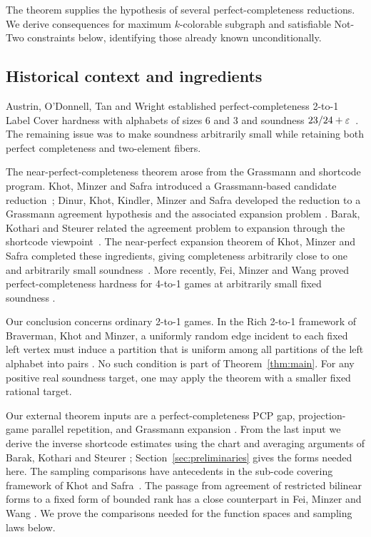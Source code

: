The theorem supplies the hypothesis of several perfect-completeness
reductions.  We derive consequences for maximum $k$-colorable subgraph
and satisfiable Not-Two constraints below, identifying those already
known unconditionally.

\subsection{Historical context and ingredients}

Austrin, O'Donnell, Tan and Wright established perfect-completeness 2-to-1
Label Cover hardness with alphabets of sizes $6$ and $3$ and soundness
$23/24+\varepsilon$~\cite[Theorem~1.3, author manuscript]{AustrinODonnellTanWright2014}.
The remaining issue was to make soundness arbitrarily small while retaining
both perfect completeness and two-element fibers.

The near-perfect-completeness theorem arose from the Grassmann and shortcode
program.  Khot, Minzer and Safra introduced a Grassmann-based candidate
reduction~\cite{KhotMinzerSafra2017}; Dinur, Khot, Kindler, Minzer and Safra
developed the reduction to a Grassmann agreement hypothesis and the
associated expansion problem
\cite{DinurKhotKindlerMinzerSafra2018,DinurKhotKindlerMinzerSafra2021}.
Barak, Kothari and Steurer related the agreement problem to expansion through
the shortcode viewpoint~\cite{BarakKothariSteurer2018}.
The near-perfect expansion theorem of Khot, Minzer and Safra completed these
ingredients, giving completeness arbitrarily close to one and arbitrarily
small soundness~\cite{KhotMinzerSafra2018}.
More recently, Fei, Minzer and Wang proved perfect-completeness hardness for
4-to-1 games at arbitrarily small fixed soundness
\cite[Theorem~1.6]{FeiMinzerWang2026}.

Our conclusion concerns ordinary 2-to-1 games.  In the Rich 2-to-1
framework of Braverman, Khot and Minzer, a uniformly random edge incident
to each fixed left vertex must induce a partition that is uniform among
all partitions of the left alphabet into pairs
\cite[Definition~5]{BravermanKhotMinzer2021}.  No such condition is part
of Theorem~\ref{thm:main}.  For any positive real soundness target, one may apply
the theorem with a smaller fixed rational target.

Our external theorem inputs are a perfect-completeness PCP gap,
projection-game parallel repetition, and Grassmann expansion
\cite{Dinur2007,DinurSteurer2014,KhotMinzerSafra2018}.
From the last input we derive the inverse shortcode estimates using the
chart and averaging arguments of Barak, Kothari and Steurer
\cite{BarakKothariSteurer2018}; Section~\ref{sec:preliminaries}
gives the forms needed here.
The sampling comparisons have antecedents in the sub-code covering
framework of Khot and Safra~\cite{KhotSafra2013}.  The passage from
agreement of restricted bilinear forms to a fixed form of bounded rank
has a close counterpart in Fei, Minzer and Wang
\cite[Lemmas~5.15--5.16]{FeiMinzerWang2026}.
We prove the comparisons needed for the function spaces and sampling
laws below.

